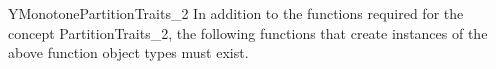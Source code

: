 \begin{ccRefConcept}{YMonotonePartitionTraits_2}
In addition to the functions required for the concept PartitionTraits\_2,
the following functions that create instances of the above function 
object types must exist.




\ccHasModels


%

\end{ccRefConcept}


